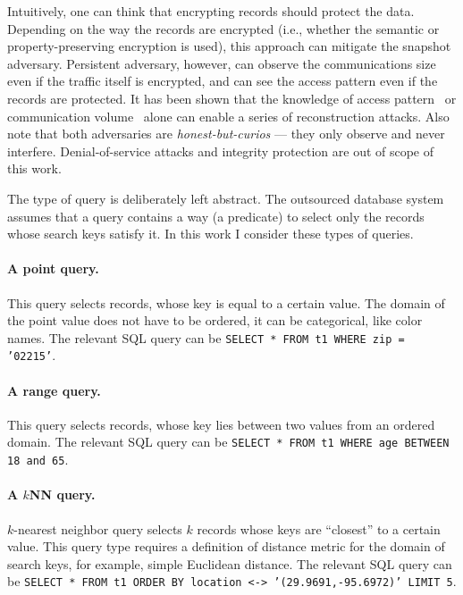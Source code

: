 		Intuitively, one can think that encrypting records should protect the data.
		Depending on the way the records are encrypted (i.e., whether the semantic or property-preserving encryption is used), this approach can mitigate the snapshot adversary.
		Persistent adversary, however, can observe the communications size even if the traffic itself is encrypted, and can see the access pattern even if the records are protected.
		It has been shown that the knowledge of access pattern~\cite{multidimensional-range-queries, inference-attack-islam-14, leakage-abuse-attacks-cash-15, inference-attacks-naveed-15, generic-attacks-kellaris, attacks-tao-of-inference, grubbs-attacks, access-pattern-disclosure, attacks-improved-reconstruction} or communication volume~\cite{generic-attacks-kellaris, state-of-uniform, attacks-improved-reconstruction, pump-volume-attacks, volume-range-attacks} alone can enable a series of reconstruction attacks.
		Also note that both adversaries are \emph{honest-but-curios} --- they only observe and never interfere.
		Denial-of-service attacks and integrity protection are out of scope of this work.

		The type of query \query{} is deliberately left abstract.
		The outsourced database system assumes that a query contains a way (a predicate) to select only the records whose search keys satisfy it.
		In this work I consider these types of queries.

		\paragraph*{A point query.}
			This query selects records, whose key is equal to a certain value.
			The domain of the point value does not have to be ordered, it can be categorical, like color names.
			The relevant SQL query can be \texttt{SELECT * FROM t1 WHERE zip = '02215'}.

		\paragraph*{A range query.}
			This query selects records, whose key lies between two values from an ordered domain.
			The relevant SQL query can be \texttt{SELECT * FROM t1 WHERE age BETWEEN 18 and 65}.

		\paragraph*{A $k$NN query.}
			$k$-nearest neighbor query selects $k$ records whose keys are ``closest'' to a certain value.
			This query type requires a definition of distance metric for the domain of search keys, for example, simple Euclidean distance.
			The relevant SQL query can be \texttt{SELECT * FROM t1 ORDER BY location <-> '(29.9691,-95.6972)' LIMIT 5}. %

